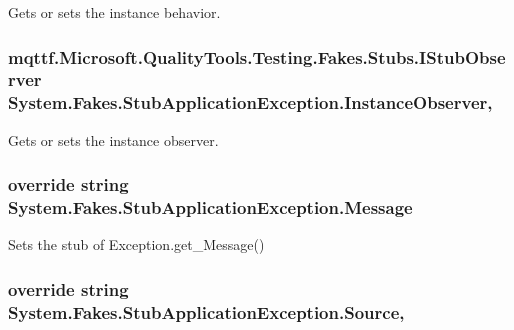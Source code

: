 Gets or sets the instance behavior.

\hypertarget{class_system_1_1_fakes_1_1_stub_application_exception_a2600a0782fadb50dd9b899141a9835c1}{
\subsubsection[{Instance\-Observer}]{\setlength{\rightskip}{0pt plus 5cm}mqttf.\-Microsoft.\-Quality\-Tools.\-Testing.\-Fakes.\-Stubs.\-I\-Stub\-Observer System.\-Fakes.\-Stub\-Application\-Exception.\-Instance\-Observer\hspace{0.3cm}{\ttfamily [get]}, {\ttfamily [set]}}}\label{class_system_1_1_fakes_1_1_stub_application_exception_a2600a0782fadb50dd9b899141a9835c1}


Gets or sets the instance observer.

\hypertarget{class_system_1_1_fakes_1_1_stub_application_exception_a7c4baed579c6d19671b52547c4919cfe}{
\subsubsection[{Message}]{\setlength{\rightskip}{0pt plus 5cm}override string System.\-Fakes.\-Stub\-Application\-Exception.\-Message\hspace{0.3cm}{\ttfamily [get]}}}\label{class_system_1_1_fakes_1_1_stub_application_exception_a7c4baed579c6d19671b52547c4919cfe}


Sets the stub of Exception.\-get\-\_\-\-Message()

\hypertarget{class_system_1_1_fakes_1_1_stub_application_exception_aa483f84cda001e4426bddd09602d7f44}{
\subsubsection[{Source}]{\setlength{\rightskip}{0pt plus 5cm}override string System.\-Fakes.\-Stub\-Application\-Exception.\-Source\hspace{0.3cm}{\ttfamily [get]}, {\ttfamily [set]}}}\label{class_system_1_1_fakes_1_1_stub_application_exception_aa483f84cda001e4426bddd09602d7f44}


